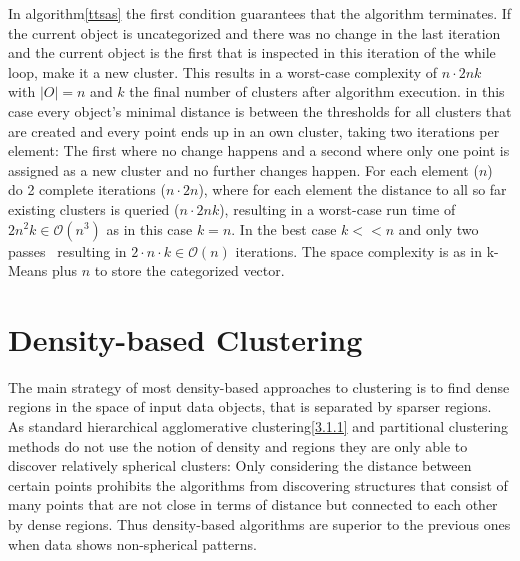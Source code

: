In algorithm\ref{ttsas} the first condition guarantees that the algorithm terminates. If the current object is uncategorized and there was no change in the last iteration and the current object is the first that is inspected in this iteration of the while loop, make it a new cluster. This results in a worst-case complexity of $n \cdot 2nk$ with $|O| = n$ and $k$ the final number of clusters after algorithm execution. in this case every object's minimal distance is between the thresholds for all clusters that are created and every point ends up in an own cluster, taking two iterations per element: The first where no change happens and a second where only one point is assigned as a new cluster and no further changes happen. For each element ($n$) do 2 complete iterations ($n \cdot 2n$), where for each element the distance to all so far existing clusters is queried ($n \cdot 2nk$), resulting in a worst-case run time of $2n^2k \in \mathcal{O}(n^3)$ as in this case $k = n$. In the best case $k << n$ and only two passes~\cite{THEODORIDIS2009627} resulting in $2 \cdot n \cdot k \in \mathcal{O}(n)$ iterations. The space complexity is as in k-Means plus $n$ to store the categorized vector.


\section{Density-based Clustering}
The main strategy of most density-based approaches to clustering is to find dense regions in the space of input data objects, that is separated by sparser regions. As standard hierarchical agglomerative clustering\ref{3.1.1} and partitional clustering methods do not use the notion of density and regions they are only able to discover relatively spherical clusters: Only considering the distance between certain points prohibits the algorithms from discovering structures that consist of many points that are not close in terms of distance but connected to each other by dense regions. Thus density-based algorithms are superior to the previous ones when data shows non-spherical patterns. \\

